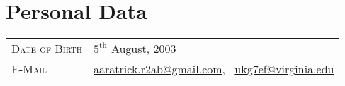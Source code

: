 \documentclass[a4paper, oneside, final]{scrartcl} %
\begin{document}


\begin{center}

  {\fontsize{32}{32}\selectfont\scshape{}} %
  \vspace{0.25 cm}

  {\fontsize{20}{20}\selectfont\scshape{}}
  \vspace{0.5 cm} %




  \section{Personal Data}

  \begin{tabularx}{0.97\linewidth}{>{\raggedleft\scshape}p{4cm}X}
    Date of Birth & \( {5}^{\text{th}} \) August, 2003                                                                                          \\
    E-Mail        & \href{mailto:aaratrick.r2ab@gmail.com}{aaratrick.r2ab@gmail.com}, \, \href{mailto:ukg7ef@virginia.edu}{ukg7ef@virginia.edu} \\
  \end{tabularx}


\end{center}
\end{document}
